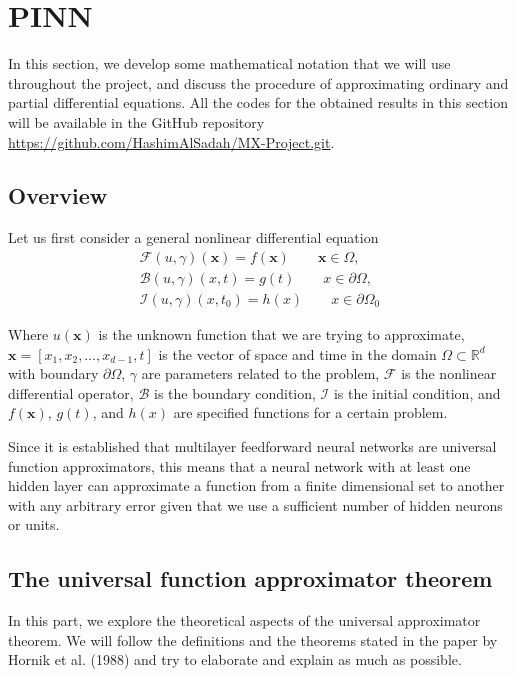 \documentclass[a4paper,12pt]{article}
\theoremstyle{definition}
\begin{document}
\section{PINN}
In this section, we develop some mathematical notation that we will use throughout the project, 
and discuss the procedure of approximating ordinary and partial differential equations. 
All the codes for the obtained results in this section will be available in the GitHub repository 
\url{https://github.com/HashimAlSadah/MX-Project.git}.

\subsection{Overview}\label{pinn overview}
Let us first consider a general nonlinear differential equation
\begin{equation}\label{general_PDE}
\begin{aligned}
\mathcal{F}(u, \gamma)(\mathbf{x}) = f(\mathbf{x}) \qquad \mathbf{x} \in  \Omega,\\
\mathcal{B}(u, \gamma)(x, t) = g(t) \qquad x \in \partial{\Omega}, \\
\mathcal{I}(u, \gamma)(x, t_0) = h(x) \qquad x \in \partial{\Omega_0}
\end{aligned}
\end{equation}

Where $u(\mathbf{x})$ is the unknown function that we are trying to approximate, 
$\mathbf{x} = [ x_1, x_2, \dots, x_{d-1}, t]$ is the vector of space and time 
in the domain $\Omega \subset \mathbb{R}^d$  with boundary $\partial{\Omega}$, 
$\gamma$ are parameters related to the problem, $\mathcal{F}$ is the nonlinear 
differential operator, $\mathcal{B}$ is the boundary condition, $\mathcal{I}$ is 
the initial condition, and $f(\mathbf{x})$, $g(t)$, and $h(x)$ are specified 
functions for a certain problem. 

Since it is established that multilayer feedforward neural networks 
are universal function approximators\cite{hornik1989multilayer}, this means that 
a neural network with at least one hidden layer can approximate a function 
from a finite dimensional set to another with any arbitrary error 
given that we use a sufficient number of hidden neurons or units.

\subsection{The universal function approximator theorem}
In this part, we explore the theoretical aspects of the universal approximator theorem.
We will follow the definitions and the theorems stated in the paper 
by Hornik et al. (1988) and try to elaborate and explain as much as possible. 
\end{document}
